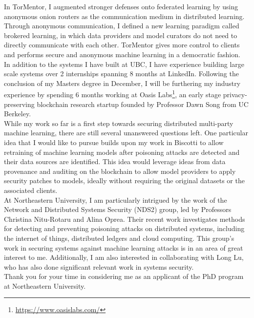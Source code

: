 \documentclass[10pt]{article} %
\begin{document}
In TorMentor, I augmented stronger defenses onto federated learning by using anonymous onion routers as the communication medium in distributed learning. Through anonymous communication, I defined a new learning paradigm called brokered learning, in which data providers and model curators do not need to directly communicate with each other. TorMentor gives more control to clients and performs secure and anonymous machine learning in a democratic fashion. \\

In addition to the systems I have built at UBC, I have experience building large scale systems over 2 internships spanning 8 months at LinkedIn. Following the conclusion of my Masters degree in December, I will be furthering my industry experience by spending 6 months working at Oasis Labs\footnote{\url{https://www.oasislabs.com/}}, an early stage privacy-preserving blockchain research startup founded by Professor Dawn Song from UC Berkeley. \\

While my work so far is a first step towards securing distributed multi-party machine learning, there are still several unanswered questions left. One particular idea that I would like to pursue builds upon my work in Biscotti to allow retraining of machine learning models after poisoning attacks are detected and their data sources are identified. This idea would leverage ideas from data provenance and auditing on the blockchain to allow model providers to apply security patches to models, ideally without requiring the original datasets or the associated clients. \\

At Northeastern University, I am particularly intrigued by the work of the Network and Distributed Systems Security (NDS2) group, led by Professors Christina Nitu-Rotaru and Alina Oprea. Their recent work investigates methods for detecting and preventing poisoning attacks on distributed systems, including the internet of things, distributed ledgers and cloud computing. This group's work in securing systems against machine learning attacks is in an area of great interest to me. Additionally, I am also interested in collaborating with Long Lu, who has also done significant relevant work in systems security. \\

Thank you for your time in considering me as an applicant of the PhD program at Northeastern University.
\end{document}
